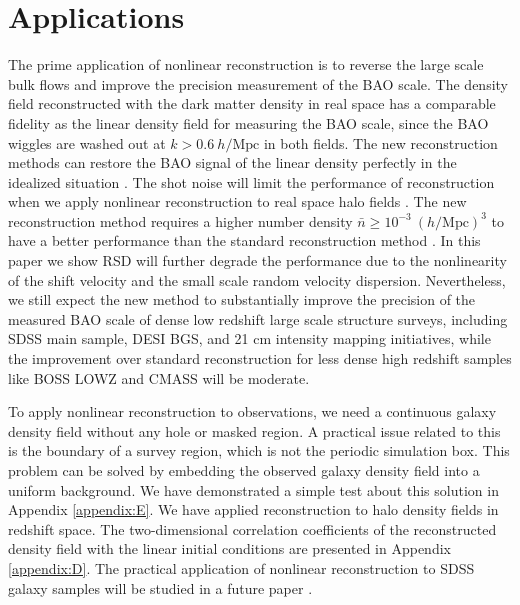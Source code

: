 \documentclass[aps,prd,twocolumn,superscriptaddress,groupedaddress,nofootinbib,amsfont]{revtex4}  %
\newcommand{\mr}{\mathrm}
\begin{document}
\section{Applications}
\label{sec:app}

The prime application of nonlinear reconstruction is to reverse the large scale
bulk flows and improve the precision measurement of the BAO scale. 
The density field reconstructed with the dark matter density in real space has
a comparable fidelity as the linear density field for measuring the BAO scale,
since the BAO wiggles are washed out at $k>0.6\ h/\mr{Mpc}$ in both fields.
The new reconstruction methods can restore the BAO signal of the linear density
perfectly in the idealized situation \cite{2017Marcel,2017Wang}.
The shot noise will limit the performance of reconstruction when we apply 
nonlinear reconstruction to real space halo fields \cite{2017Yu}.
The new reconstruction method requires a higher number density
$\bar{n}\geq10^{-3}\ (h/\mr{Mpc})^3$ to have a better performance than the 
standard reconstruction method \cite{2017Yu}.
In this paper we show RSD will further degrade the performance due to the nonlinearity of the shift velocity and the small scale random velocity dispersion.
Nevertheless, we still expect the new method to substantially improve the 
precision of the measured BAO scale of dense low redshift large scale 
structure surveys, including SDSS main sample, DESI BGS, and 21 cm intensity
mapping initiatives, while the improvement over standard reconstruction for
less dense high redshift samples like BOSS LOWZ and CMASS will be moderate.

To apply nonlinear reconstruction to observations, we need a continuous galaxy
density field without any hole or masked region. A practical issue related to 
this is the boundary of a survey region, which is not the periodic simulation 
box. This problem can be solved by embedding the observed galaxy density field 
into a uniform background. We have demonstrated a simple test about this 
solution in Appendix \ref{appendix:E}. 
We have applied reconstruction to halo density fields in redshift space. 
The two-dimensional correlation coefficients of the reconstructed density field
with the linear initial conditions are presented in Appendix \ref{appendix:D}.
The practical application of nonlinear reconstruction to SDSS galaxy samples 
will be studied in a future paper \cite{2017Zhu}.
\end{document}
